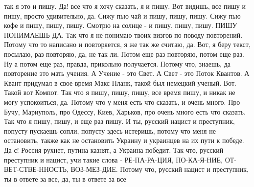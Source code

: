  
 
 
 
 

так я это и пишу. Да!  все что я хочу сказать, я и пишу. Вот видишь, все пишу и
пишу, просто удивительно, да. Сижу пью чай и пишу, пишу, пишу. Сижу пью кофе и
пишу, пишу, пишу.  Смотрю на солнце - и пишу, пишу, пишу. ПИШУ ПОНИМАЕШЬ ДА.
Так что я не понимаю твоих визгов по поводу повторений. Потому что то написано
и повторяется, я же так же считаю, да.  Вот, я беру текст, посылаю, раз
повторяю, да, не так ли. Потом еще раз повторяю, потом еще раз. Ну а потом еще
раз, правда, прикольно получается. Потому что, знаешь, да повторение это мать
учения.  А Учение - это Свет. А Свет - это Поток Квантов. А Квант придумал в
свое время Макс Планк, такой был немецкий ученый. Вот. Такой вот Компот. Так
что я пишу, пишу, пишу, все время пишу, и никак не могу успокоиться, да. Потому
что у меня есть что сказать, и очень много. Про Бучу, Мариуполь, про Одессу,
Киев, Харьков, про очень много есть что сказать. Так что я пишу, пишу, и еще
раз пишу.  И ты, русский нацист и преступник, попусту пускаешь сопли, попусту
здесь истеришь, потому что меня не остановить, также как не остановить Украину
и украинцев на их пути к победе. Да-с! Россия рухнет, путина казнят, а Украина
победит.  Так что, русский преступник и нацист, учи такие слова - РЕ-ПА-РА-ЦИЯ,
ПО-КА-Я-НИЕ, ОТ-ВЕТ-СТВЕ-ННОСТЬ, ВОЗ-МЕЗ-ДИЕ.  Потому что, русский нацист и
преступник, ты в ответе за все, да, ты в ответе за все


